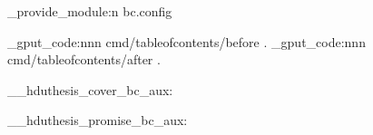 \ExplSyntaxOn \makeatletter
\hduthesis_provide_module:n {bc.config}

\geometry { top = 3.25cm, bottom = 2.4cm, left = 4cm, right = 2cm,
            headheight = 15pt, headsep = .72cm }
\hook_gput_code:nnn {cmd/tableofcontents/before} { . }
  {
    \clearpage 
     \cfoot{\small \thepage}
  }
\hook_gput_code:nnn { cmd/tableofcontents/after } { . }
  {
    \thispagestyle{fancy} \clearpage
     \cfoot{}
  }

\RenewDocumentCommand \maketitle {}
  {
    \begin{titlepage}
      \__hduthesis_cover_bc_aux:
    \end{titlepage}
    \titlepage
      \__hduthesis_promise_bc_aux:
    \endtitlepage
    \restoregeometry
  }

